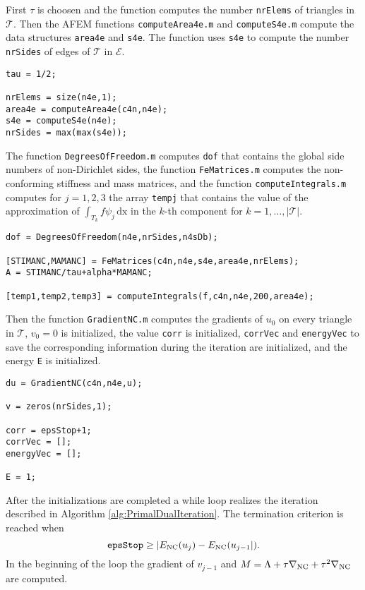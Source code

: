 First $\tau$ is choosen and the function computes the number \texttt{nrElems} 
of triangles in $\mathcal T$.
Then the AFEM functions \texttt{computeArea4e.m} and 
\texttt{computeS4e.m} compute the data structures
\texttt{area4e} and \texttt{s4e}. The function uses \texttt{s4e} to compute the number 
\texttt{nrSides} of edges of $\mathcal T$ in $\mathcal E$.
\begin{lstlisting}[frame=single,numbers=none]
tau = 1/2;

nrElems = size(n4e,1);
area4e = computeArea4e(c4n,n4e);
s4e = computeS4e(n4e);
nrSides = max(max(s4e));
\end{lstlisting}
The function \texttt{DegreesOfFreedom.m} computes \texttt{dof} that contains 
the global side numbers of non-Dirichlet sides, the function \texttt{FeMatrices.m} computes 
the non-conforming stiffness and mass matrices, and the function \texttt{computeIntegrals.m} 
computes
for $j=1,2,3$ the array
\texttt{tempj} that contains the value of the approximation of 
$
\int_{T_k} f\psi_j\,\mathrm{dx} 
$
in the $k$-th component for $k=1,\dots,|\mathcal T|$.
\begin{lstlisting}[frame=single,numbers=none]
dof = DegreesOfFreedom(n4e,nrSides,n4sDb);

[STIMANC,MAMANC] = FeMatrices(c4n,n4e,s4e,area4e,nrElems);
A = STIMANC/tau+alpha*MAMANC; 

[temp1,temp2,temp3] = computeIntegrals(f,c4n,n4e,200,area4e);
\end{lstlisting}
Then the function \texttt{GradientNC.m} computes the gradients of $u_0$ on every triangle 
in $\mathcal T$, $v_0=0$ is 
initialized, the value \texttt{corr} is initialized, \texttt{corrVec} and \texttt{energyVec} 
to save the corresponding information during the iteration are initialized, 
and the energy \texttt{E} is
initialized.

\begin{lstlisting}[frame=single,numbers=none]
du = GradientNC(c4n,n4e,u);

v = zeros(nrSides,1);    

corr = epsStop+1; 
corrVec = [];
energyVec = [];

E = 1;
\end{lstlisting}
After the initializations are completed a while loop realizes the iteration
described in Algorithm \ref{alg:PrimalDualIteration}. The termination criterion
is reached when 
$$
\texttt{epsStop}\geq|E_\textup{NC}(u_j)-E_\textup{NC}(u_{j-1}|).
$$
In the beginning of the loop the gradient of $v_{j-1}$ and 
$M=\Lambda +\tau\nabla_\textup{NC}+\tau^2\nabla_\textup{NC}$ are
computed.

